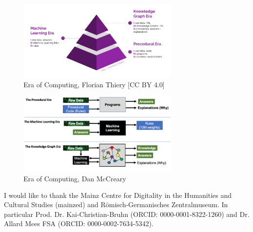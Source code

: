 \documentclass[twocolumn]{autart}
\begin{document}
\begin{figure}[!htb]
\begin{center}
\includegraphics[width=8cm]{Era_of_Computing.png}    %
\caption{Era of Computing, Florian Thiery [CC BY 4.0]}  %
\label{figeoc}                                 %
\end{center}                                 %
\end{figure}

\begin{figure}[!htb]
\begin{center}
\includegraphics[width=8cm]{1_78b9DR1EApGRAst5FkPrwQ.png}    %
\caption{Era of Computing, Dan McCreary \cite{mccreary_computing}}  %
\label{figeoco}                                 %
\end{center}                                 %
\end{figure}

\begin{ack}                               
I would like to thank the Mainz Centre for Digitality in the Humanities and Cultural Studies (mainzed) and R\"omisch-Germanisches Zentralmuseum. In particular Prod. Dr. Kai-Christian-Bruhn (ORCID: 0000-0001-8322-1260) and Dr. Allard Mees FSA (ORCID: 0000-0002-7634-5342).
\end{ack}

\end{document}
